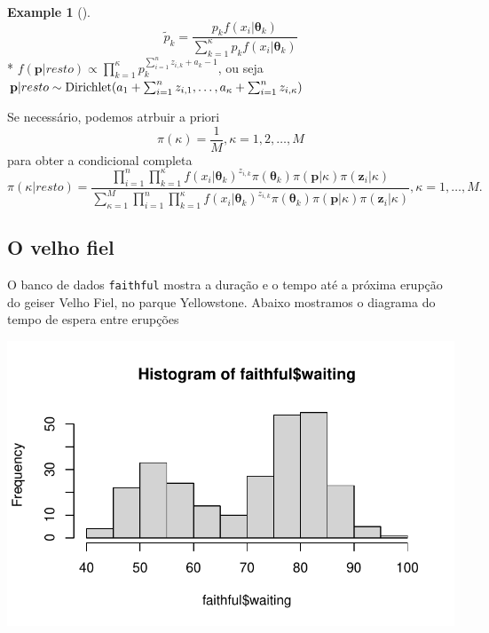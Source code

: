 \documentclass[
  letterpaper,
  DIV=11,
  numbers=noendperiod]{scrreprt}
\newenvironment{Shaded}{\begin{snugshade}}{\end{snugshade}}
\newcommand{\FunctionTok}[1]{\textcolor[rgb]{0.28,0.35,0.67}{#1}}
\newcommand{\NormalTok}[1]{\textcolor[rgb]{0.00,0.23,0.31}{#1}}
\newcommand{\SpecialCharTok}[1]{\textcolor[rgb]{0.37,0.37,0.37}{#1}}
\theoremstyle{definition}
\theoremstyle{plain}
\theoremstyle{definition}
\newtheorem{example}{Example}[chapter]
\theoremstyle{remark}
\begin{document}
\begin{example}[]
\[\tilde{p}_k=\frac{p_kf(x_i|\boldsymbol{\theta}_k)}{\sum_{k=1}^\kappa p_kf(x_i|\boldsymbol{\theta}_k)}\]
*
\(f(\textbf{p}|resto)\propto \prod_{k=1}^\kappa p_k^{\sum_{i=1}^n z_{i,k}+a_k-1}\),
ou seja
\(\textbf{p}|resto\sim\hbox{Dirichlet}(a_1+\sum_{i=1}^n z_{i,1},\ldots,a_\kappa+\sum_{i=1}^n z_{i,\kappa})\)

Se necessário, podemos atrbuir a priori
\[\pi(\kappa)=\frac{1}{M},\kappa=1,2,\ldots,M\] para obter a condicional
completa
\[\pi(\kappa|resto)=\frac{\prod_{i=1}^n\prod_{k=1}^\kappa f(x_i|\boldsymbol{\theta}_k)^{z_{i,k}}\pi(\boldsymbol{\theta}_k)\pi(\textbf{p}|\kappa)\pi(\textbf{z}_i|\kappa)}{\sum_{\kappa=1}^M \prod_{i=1}^n\prod_{k=1}^\kappa f(x_i|\boldsymbol{\theta}_k)^{z_{i,k}}\pi(\boldsymbol{\theta}_k)\pi(\textbf{p}|\kappa)\pi(\textbf{z}_i|\kappa)},\kappa=1,\ldots,M.\]

\subsection{O velho fiel}\label{o-velho-fiel}

O banco de dados \texttt{faithful} mostra a duração e o tempo até a
próxima erupção do geiser Velho Fiel, no parque Yellowstone. Abaixo
mostramos o diagrama do tempo de espera entre erupções

\begin{Shaded}
\end{Shaded}

\includegraphics{misturas_files/figure-pdf/unnamed-chunk-8-1.pdf}


\end{example}
\end{document}
